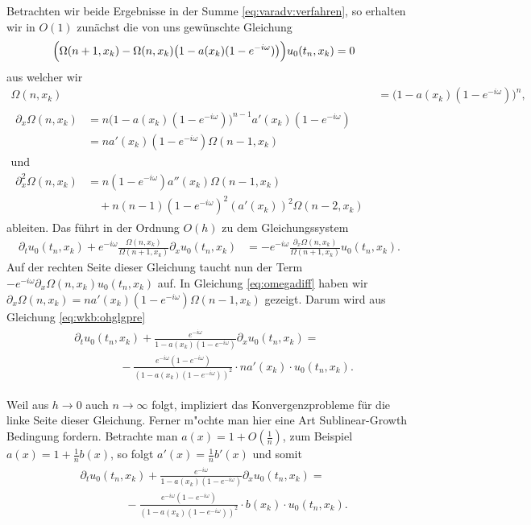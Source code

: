 Betrachten wir beide Ergebnisse in der Summe \eqref{eq:varadv:verfahren}, so erhalten wir in $O(1)$ zunächst die von uns gewünschte Gleichung
\begin{align}
\Bigl( \Omega(n+1, x_k)  - \Omega(n,x_k) \bigl(1 - a(x_k) (1-e^{-i\omega}) \bigr) \Bigr) u_0(t_n, x_k) &= 0
\end{align}
aus welcher wir
\begin{align}
\Omega(n,x_k) &= \bigl(1 - a(x_k) (1-e^{-i\omega}) \bigr)^n,\\
\begin{split}\label{eq:omegadiff}
\partial_x \Omega(n,x_k) &= n \bigl(1 - a(x_k) (1-e^{-i\omega}) \bigr)^{n-1} a'(x_k) (1-e^{-i\omega})\\
&= n a'(x_k) (1-e^{-i\omega}) \Omega(n-1, x_k)
\end{split}\\
\text{und} \nonumber\\
\begin{split}
\partial^2_x \Omega(n,x_k) &= n (1-e^{-i\omega}) a''(x_k) \Omega(n-1, x_k)\\
&\quad + n (n-1) (1-e^{-i\omega})^2 (a'(x_k))^2 \Omega(n-2,x_k)
\end{split}
\end{align}
ableiten.
Das führt in der Ordnung $O(h)$ zu dem Gleichungssystem
\begin{align}\label{eq:wkb:ohglgpre}
\partial_t u_0(t_n, x_k) + e^{-i \omega} \frac{\Omega(n,x_k)}{\Omega(n+1, x_k)} \partial_x u_0(t_n, x_k) &= - e^{-i \omega} \frac{\partial_x \Omega(n,x_k)}{\Omega(n+1, x_k)} u_0(t_n, x_k).
\end{align}
Auf der rechten Seite dieser Gleichung taucht nun der Term $- e^{-i \omega} \partial_x \Omega(n,x_k) u_0(t_n, x_k)$ auf.
In Gleichung \eqref{eq:omegadiff} haben wir $\partial_x \Omega(n,x_k) = n a'(x_k) (1-e^{-i\omega}) \Omega(n-1, x_k)$ gezeigt.
Darum wird aus Gleichung \eqref{eq:wkb:ohglgpre} 
\begin{align}\label{eq:wkb:ohpost}
\begin{split}
&\partial_t u_0(t_n, x_k) + \frac{e^{-i \omega}}{1 - a(x_k) (1-e^{-i\omega})} \partial_x u_0(t_n, x_k) =\\
&\qquad \qquad - \frac{e^{-i \omega} (1 - e^{-i\omega})}{(1 - a(x_k) (1-e^{-i\omega}))^2} \cdot n a'(x_k) \cdot u_0(t_n, x_k).
\end{split}
\end{align}

Weil aus $h \to 0$ auch $n \to \infty$ folgt, impliziert das Konvergenzprobleme für die linke Seite dieser Gleichung.
Ferner m"ochte man hier eine Art Sublinear-Growth Bedingung fordern.
Betrachte man $a(x) = 1 + O\left(\frac{1}{n} \right)$, zum Beispiel $a(x) = 1 + \frac{1}{n} b(x)$, so folgt $a'(x) = \frac{1}{n} b'(x)$ und somit
\begin{align}\label{eq:wkb:ohpost2}
\begin{split}
&\partial_t u_0(t_n, x_k) + \frac{e^{-i \omega}}{1 - a(x_k) (1-e^{-i\omega})} \partial_x u_0(t_n, x_k) =\\
&\qquad \qquad - \frac{e^{-i \omega} (1 - e^{-i\omega})}{(1 - a(x_k) (1-e^{-i\omega}))^2} \cdot b(x_k) \cdot u_0(t_n, x_k).
\end{split}
\end{align}

